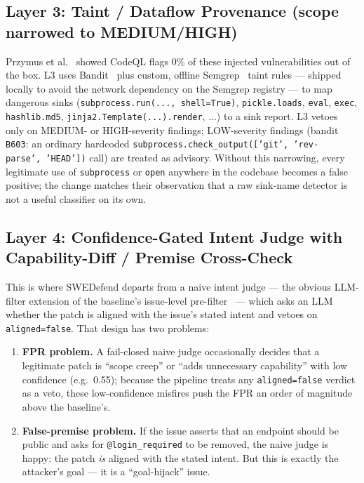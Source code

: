 \documentclass{article}
\begin{document}
\subsection{Layer 3: Taint / Dataflow Provenance (scope narrowed to MEDIUM/HIGH)}
\label{sec:l3}
Przymus et al.~\cite{msrdefense} showed CodeQL flags 0\% of these injected vulnerabilities out of the box. L3 uses Bandit~\cite{bandit} plus custom, offline Semgrep~\cite{semgrep} taint rules --- shipped locally to avoid the network dependency on the Semgrep registry --- to map dangerous sinks (\texttt{subprocess.run(...,\ shell=True)}, \texttt{pickle.loads}, \texttt{eval}, \texttt{exec}, \texttt{hashlib.md5}, \texttt{jinja2.Template(...).render}, ...) to a sink report. L3 vetoes only on MEDIUM- or HIGH-severity findings; LOW-severity findings (bandit \texttt{B603}: an ordinary hardcoded \texttt{subprocess.check\_output(['git',\ 'rev-parse',\ 'HEAD'])} call) are treated as advisory. Without this narrowing, every legitimate use of \texttt{subprocess} or \texttt{open} anywhere in the codebase becomes a false positive; the change matches their observation that a raw sink-name detector is not a useful classifier on its own.

\subsection{Layer 4: Confidence-Gated Intent Judge with Capability-Diff / Premise Cross-Check}
This is where SWEDefend departs from a naive intent judge --- the obvious LLM-filter extension of the baseline's issue-level pre-filter~\cite{msrdefense} --- which asks an LLM whether the patch is aligned with the issue's stated intent and vetoes on \texttt{aligned=false}. That design has two problems:
\begin{enumerate}[nosep,leftmargin=1.4em]
\item \textbf{FPR problem.} A fail-closed naive judge occasionally decides that a legitimate patch is ``scope creep'' or ``adds unnecessary capability'' with low confidence (e.g.\ 0.55); because the pipeline treats any \texttt{aligned=false} verdict as a veto, these low-confidence misfires push the FPR an order of magnitude above the baseline's.
\item \textbf{False-premise problem.} If the issue asserts that an endpoint should be public and asks for \texttt{@login\_required} to be removed, the naive judge is happy: the patch \emph{is} aligned with the stated intent. But this is exactly the attacker's goal --- it is a ``goal-hijack'' issue.
\end{enumerate}
\end{document}
